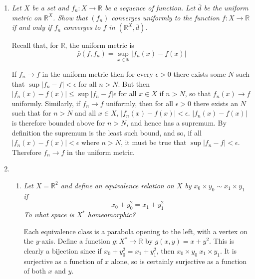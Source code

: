 \documentclass[10pt]{article}
\newcommand{\N}{\mathbb{N}}
\newcommand{\R}{\mathbb{R}}
\begin{document}
\begin{enumerate}
\begin{proof}
Therefore $(1+h)^n \geq 1 + nh$ for all $n \in \N$.
\end{proof}

Using the approximation from the above lemma, it follows that $\lim_{n \rightarrow \infty} a^n = \infty$ for $a > 1$, and hence, for $0 \leq a < 1$, $\lim_{n \rightarrow \infty} a^n = 0$.  Let $f_n(x) = x^n$ for $0 \leq x \leq 1$.  If $x < 1$ then $f_n(x) \rightarrow 0$, but if $x = 1$, then $f_n(x) \rightarrow 1$.  From basic calculus we know that each $x^n$ is uniformly continuous on any closed and bounded interval, and hence, if $f_n(x)$ converged uniformly on $[0,1]$ it would converge to something continuous.  As this is not the case, $f_n(x)$ cannot converge uniformly there.

\item \emph{Let $X$ be a set and $f_n: X \rightarrow \R$ be a sequence of function.  Let $\bar{d}$ be the uniform metric on $\R^X$.  Show that $(f_n)$ converges uniformly to the function $f: X \rightarrow \R$ if and only if $f_n$ converges to $f$ in $(\R^X, \bar{d})$.}

Recall that, for $\R$, the uniform metric is
\[
\bar{\rho}(f,f_n) = \sup_{x \in \R}| f_n(x) - f(x) |
\]

If $f_n \rightarrow f$ in the uniform metric then for every $\epsilon > 0$ there exists some $N$ such that $\sup |f_n - f| < \epsilon$ for all $n > N$.  But then $|f_n(x) - f(x)| \leq \sup |f_n - f| \epsilon$ for all $x \in X$ if $n > N$, so that $f_n(x) \rightarrow f$ uniformly.  Similarly, if $f_n \rightarrow f$ uniformly, then for all $\epsilon > 0$ there exists an $N$ such that for $n > N$ and all $x \in X$, $|f_n(x) - f(x)| < \epsilon$.  $|f_n(x) - f(x)|$ is therefore bounded above for $n > N$, and hence has a supremum.  By definition the supremum is the least such bound, and so, if all $|f_n(x) - f(x)| < \epsilon$ where $n > N$, it must be true that $\sup|f_n - f| < \epsilon$.  Therefore $f_n \rightarrow f$ in the uniform metric.

\item
\begin{enumerate}
\item \emph{Let $X = \R^2$ and define an equivalence relation on $X$ by $x_0 \times y_0 \sim x_1 \times y_1$ if $$x_0 + y_0^2 = x_1 + y_1^2$$  To what space is $X^\ast$ homeomorphic?}

Each equivalence class is a parabola opening to the left, with a vertex on the $y$-axis.  Define a function $g: X^\ast \rightarrow \R$ by $g(x,y) = x + y^2$.  This is clearly a bijection since if $x_0 + y_0^2 = x_1 + y_1^2$, then $x_0 \times y_0 ~ x_1 \times y_1$.  It is surjective as a function of $x$ alone, so is certainly surjective as a function of both $x$ and $y$.


\end{enumerate}
\end{enumerate}
\end{document}

